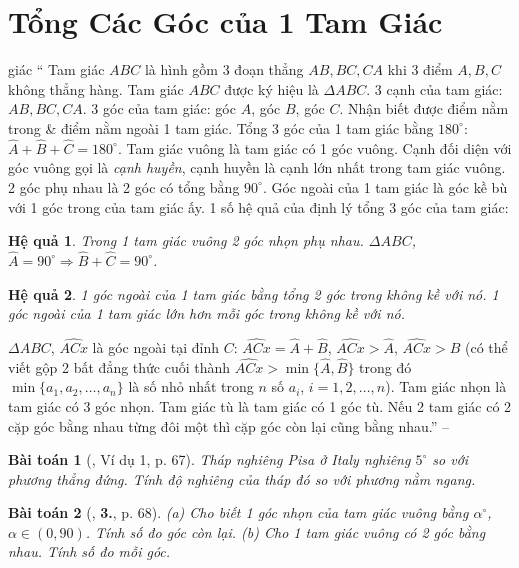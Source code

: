 \documentclass{article}
\numberwithin{equation}{section}
\newtheorem{baitoan}{Bài toán}
\newtheorem{hequa}{Hệ quả}[section]
\begin{document}

\section{Tổng Các Góc của 1 Tam Giác}giác
`` Tam giác $ABC$ là hình gồm 3 đoạn thẳng $AB,BC,CA$ khi 3 điểm $A,B,C$ không thẳng hàng. Tam giác $ABC$ được ký hiệu là $\Delta ABC$. 3 cạnh của tam giác: $AB,BC,CA$. 3 góc của tam giác: góc $A$, góc $B$, góc $C$. Nhận biết được điểm nằm trong \& điểm nằm ngoài 1 tam giác.  Tổng 3 góc của 1 tam giác bằng $180^\circ$: $\widehat{A} + \widehat{B} + \widehat{C} = 180^\circ$.  Tam giác vuông là tam giác có 1 góc vuông. Cạnh đối diện với góc vuông gọi là \textit{cạnh huyền}, cạnh huyền là cạnh lớn nhất trong tam giác vuông. 2 góc phụ nhau là 2 góc có tổng bằng $90^\circ$. Góc ngoài của 1 tam giác là góc kề bù với 1 góc trong của tam giác ấy.  1 số hệ quả của định lý tổng 3 góc của tam giác:

\begin{hequa}
	Trong 1 tam giác vuông 2 góc nhọn phụ nhau. $\Delta ABC$, $\widehat{A} = 90^\circ\Rightarrow\widehat{B} + \widehat{C} = 90^\circ$.
\end{hequa}

\begin{hequa}
	1 góc ngoài của 1 tam giác bằng tổng 2 góc trong không kề với nó. 1 góc ngoài của 1 tam giác lớn hơn mỗi góc trong không kề với nó.
\end{hequa}
$\Delta ABC$, $\widehat{ACx}$ là góc ngoài tại đỉnh $C$: $\widehat{ACx} = \widehat{A} + \widehat{B}$, $\widehat{ACx} > \widehat{A}$, $\widehat{ACx} > \widehat{B}$ (có thể viết gộp 2 bất đẳng thức cuối thành $\widehat{ACx} > \min\{\widehat{A},\widehat{B}\}$ trong đó $\min\{a_1,a_2,\ldots,a_n\}$ là số nhỏ nhất trong $n$ số $a_i$, $i = 1,2,\ldots,n$).  Tam giác nhọn là tam giác có 3 góc nhọn. Tam giác tù là tam giác có 1 góc tù. Nếu 2 tam giác có 2 cặp góc bằng nhau từng đôi một thì cặp góc còn lại cũng bằng nhau.'' -- \cite[Chap. IV, \S1, p.65]{Tuyen_Toan_7}

\begin{baitoan}[\cite{SBT_Toan_7_Canh_Dieu_tap_2}, Ví dụ 1, p. 67]
	Tháp nghiêng Pisa ở Italy nghiêng $5^\circ$ so với phương thẳng đứng. Tính độ nghiêng của tháp đó so với phương nằm ngang.
\end{baitoan}

\begin{baitoan}[\cite{SBT_Toan_7_Canh_Dieu_tap_2}, \textbf{3.}, p. 68]
	(a) Cho biết 1 góc nhọn của tam giác vuông bằng $\alpha^\circ$, $\alpha\in(0,90)$. Tính số đo góc còn lại. (b) Cho 1 tam giác vuông có 2 góc bằng nhau. Tính số đo mỗi góc.
\end{baitoan}
\end{document}
